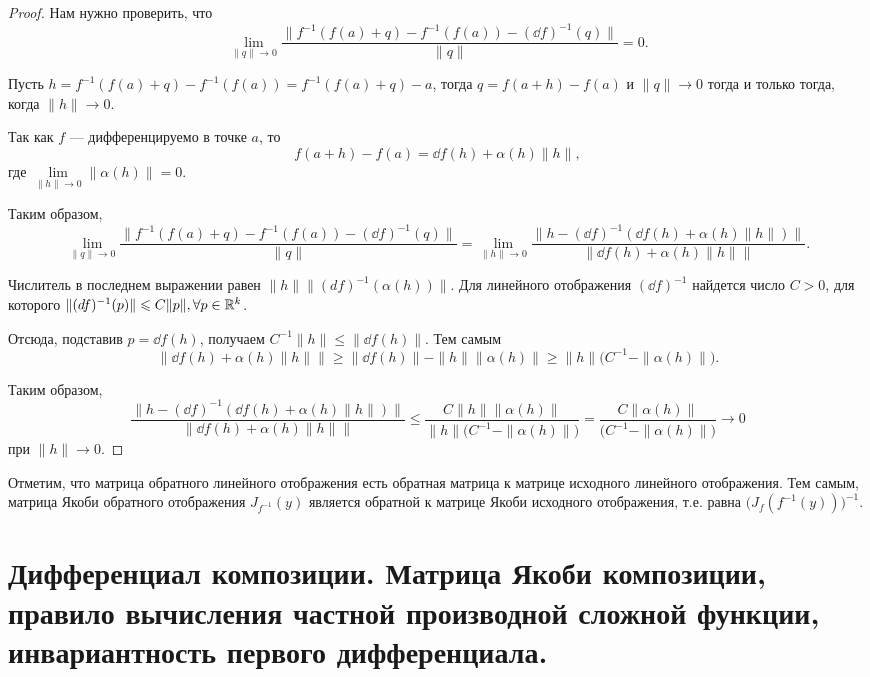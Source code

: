 \documentclass[a4paper]{article}
\theoremstyle{named}
\begin{document}
    \begin{proof}
        Нам нужно проверить, что
        $$
            \lim\limits_{\|q\|\to0}\dfrac{\|f^{-1}(f(a) + q)-f^{-1}(f(a)) - (\dd f)^{-1}(q)\|}{\|q\|}=0.
        $$

        Пусть $h=f^{-1}(f(a) + q)-f^{-1}(f(a))=f^{-1}(f(a) + q)-a$, тогда $q = f(a+h)-f(a)$ и $\|q\|\to 0$ тогда и только тогда, когда $\|h\|\to0$.

        Так как $f$ --- дифференцируемо в точке $a$, то $$f(a+h)-f(a) = \dd f(h)+\alpha(h)\|h\|,$$ где $\lim\limits_{\|h\|\to0}\|\alpha(h)\|=0$.

        Таким образом,
        $$
            \lim\limits_{\|q\|\to0}\dfrac{\|f^{-1}(f(a) + q)-f^{-1}(f(a)) - (\dd f)^{-1}(q)\|}{\|q\|}
            = \lim\limits_{\|h\|\to0}\dfrac{\bigl\|h - (\dd f)^{-1}(\dd f(h)+\alpha(h)\|h\|)\bigr\|}{\bigl\|\dd f(h)+\alpha(h)\|h\|\bigr\|}.
        $$

        Числитель в последнем выражении равен $\|h\|\bigl\|(df)^{-1}(\alpha(h))\bigr\|$. Для линейного отображения $(\dd f)^{-1}$ найдется число $C>0$, для которого $\|(\mathop{}\!d f)^{-1}(p)\| \leqslant C\|p\|,\forall p\in \mathbb{R}^k$.

        Отсюда, подставив $p=\dd f(h)$, получаем $C^{-1}\|h\|\leq\|\dd f(h)\|$. Тем самым $$\bigl\|\dd f(h)+\alpha(h)\|h\|\bigr\|\geq\|\dd f(h)\|-\|h\|\|\alpha(h)\|\geq\|h\|\bigl(C^{-1} - \|\alpha(h)\|\bigr).$$

        Таким образом,
        $$
            \dfrac{\bigl\|h - (\dd f)^{-1}(\dd f(h)+\alpha(h)\|h\|)\bigr\|}{\bigl\|\dd f(h)+\alpha(h)\|h\|\bigr\|}
            \leq \dfrac{C\|h\|\|\alpha(h)\|}{\|h\|\bigl(C^{-1} - \|\alpha(h)\|\bigr)}=
            \dfrac{C\|\alpha(h)\|}{\bigl(C^{-1} - \|\alpha(h)\|\bigr)}\to0
        $$
        при $\|h\|\to 0$.
    \end{proof}

    \begin{remark*}
        Отметим, что матрица обратного линейного отображения есть обратная матрица к матрице исходного линейного отображения.
        Тем самым, матрица Якоби обратного отображения $J_{f^{-1}}(y)$ является обратной к матрице Якоби исходного отображения,
        т.е. равна $\bigr(J_f(f^{-1}(y))\bigl)^{-1}$.
    \end{remark*}

    \section{Дифференциал композиции. Матрица Якоби композиции, правило вычисления частной производной сложной функции, инвариантность первого дифференциала.}
\end{document}
